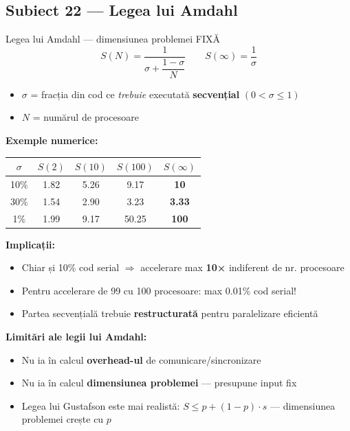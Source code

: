 \documentclass[a4paper,11pt]{article}
\newcommand{\thead}[1]{\cellcolor{tblh}\color{white}\textbf{#1}}
\newcommand{\subiect}[2]{\subsection{Subiect \textcolor{numcol}{#1} — #2}}
\begin{document}
\subiect{22}{Legea lui Amdahl}

\begin{defbox}{Legea lui Amdahl — dimensiunea problemei FIXĂ}
\[
S(N) = \frac{1}{\sigma + \dfrac{1 - \sigma}{N}}
\qquad
S(\infty) = \frac{1}{\sigma}
\]
\begin{itemize}[noitemsep]
  \item $\sigma$ = fracția din cod ce \emph{trebuie} executată \textbf{secvențial} \quad $(0 < \sigma \leq 1)$
  \item $N$ = numărul de procesoare
\end{itemize}
\end{defbox}

\textbf{Exemple numerice:}
\begin{center}
\begin{tabular}{ccccc}
\toprule
\thead{$\sigma$} & \thead{$S(2)$} & \thead{$S(10)$} & \thead{$S(100)$} & \thead{$S(\infty)$} \\
\midrule
10\% & 1.82 & 5.26 & 9.17 & \textbf{10} \\
30\% & 1.54 & 2.90 & 3.23 & \textbf{3.33} \\
1\%  & 1.99 & 9.17 & 50.25 & \textbf{100} \\
\bottomrule
\end{tabular}
\end{center}

\textbf{Implicații:}
\begin{itemize}[noitemsep]
  \item Chiar și 10\% cod serial $\Rightarrow$ accelerare max \textbf{10×} indiferent de nr. procesoare
  \item Pentru accelerare de 99 cu 100 procesoare: max 0.01\% cod serial!
  \item Partea secvențială trebuie \textbf{restructurată} pentru paralelizare eficientă
\end{itemize}

\textbf{Limitări ale legii lui Amdahl:}
\begin{itemize}[noitemsep]
  \item Nu ia în calcul \textbf{overhead-ul} de comunicare/sincronizare
  \item Nu ia în calcul \textbf{dimensiunea problemei} — presupune input fix
  \item Legea lui Gustafson este mai realistă: $S \leq p + (1-p) \cdot s$ — dimensiunea problemei crește cu $p$
\end{itemize}

\end{document}
